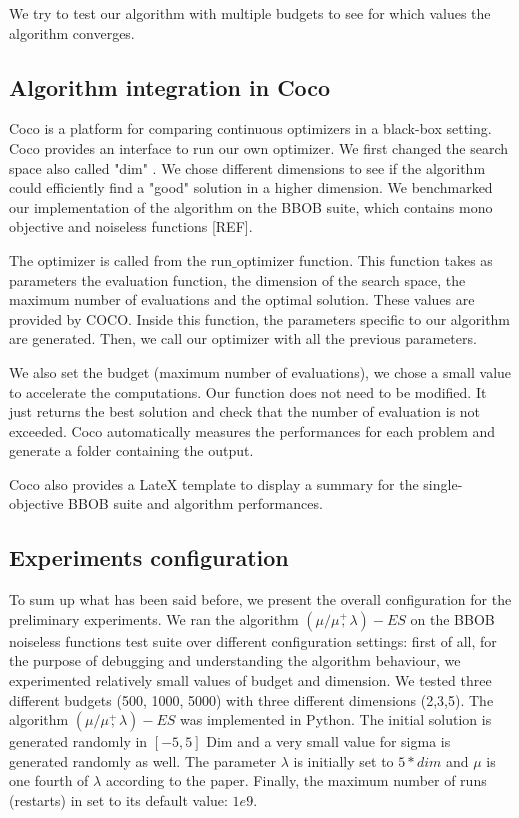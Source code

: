 \documentclass{article}
\begin{document}
We try to test our algorithm with multiple budgets to see for which values the algorithm converges.


\subsection{Algorithm integration in Coco}

Coco is a platform for comparing continuous optimizers in a black-box setting. 
Coco provides an interface to run our own optimizer. We first changed the search space also called "dim" . We chose different dimensions to see if the algorithm could efficiently find a "good" solution in a higher dimension. We benchmarked our implementation of the algorithm on  the BBOB suite, which  contains mono objective and noiseless functions [REF].

The optimizer is called from the run$\_$optimizer function. This function takes as parameters the evaluation function, the dimension of the search space, the maximum number of evaluations and the optimal solution. These values are provided by COCO. Inside this function, the parameters specific to our algorithm are generated. Then, we call our optimizer with all the previous parameters.

We also set the budget (maximum number of evaluations), we chose a small value to accelerate the computations.
Our function does not need to be modified. It just returns the best solution and check that the number of evaluation is not exceeded. 
Coco automatically measures the performances for each problem and generate a folder containing the output.  

Coco also provides a LateX template to display a summary for the single-objective BBOB suite and algorithm performances.


\subsection{Experiments configuration}
To sum up what has been said before, we present the overall configuration for the preliminary experiments. We ran the algorithm $(\mu / \mu \overset{+}{,} \lambda)-ES$  on the BBOB noiseless functions test suite over different configuration settings: first of all, for the purpose of debugging and understanding the algorithm behaviour, we experimented relatively small values of budget and dimension. We tested three different budgets (500, 1000, 5000) with three different dimensions (2,3,5). The algorithm  $(\mu / \mu \overset{+}{,} \lambda)-ES$ was implemented in Python. The initial solution is generated randomly in $[-5,5]$ Dim  and a very small value for sigma is generated randomly as well. The parameter $\lambda$ is initially set to $5*dim$ and $\mu$ is one fourth of $\lambda$ according to the paper. Finally, the maximum number of runs (restarts) in set to its default value: $1e9$.
\end{document}

